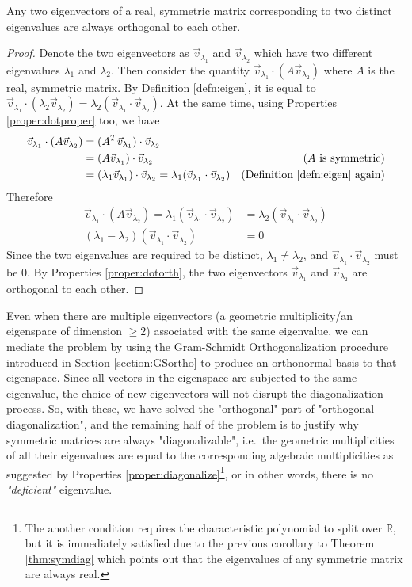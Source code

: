 \begin{proper}
\label{proper:symortho}
Any two eigenvectors of a real, symmetric matrix corresponding to two distinct eigenvalues are always orthogonal to each other.
\end{proper}
\begin{proof}
Denote the two eigenvectors as $\vec{v}_{\lambda_1}$ and $\vec{v}_{\lambda_2}$ which have two different eigenvalues $\lambda_1$ and $\lambda_2$. Then consider the quantity $\vec{v}_{\lambda_1} \cdot (A\vec{v}_{\lambda_2})$ where $A$ is the real, symmetric matrix. By Definition \ref{defn:eigen}, it is equal to $\vec{v}_{\lambda_1} \cdot (\lambda_{2}\vec{v}_{\lambda_2}) = \lambda_{2}(\vec{v}_{\lambda_1} \cdot \vec{v}_{\lambda_2})$. At the same time, using Properties \ref{proper:dotproper} too, we have
\begin{align*}
\vec{v}_{\lambda_1}\cdot (A\vec{v}_{\lambda_2}) &=    (A^T\vec{v}_{\lambda_1})\cdot \vec{v}_{\lambda_2} \\
&= (A\vec{v}_{\lambda_1})\cdot \vec{v}_{\lambda_2} &\text{($A$ is symmetric)} \\
&= (\lambda_1\vec{v}_{\lambda_1})\cdot \vec{v}_{\lambda_2} = \lambda_1(\vec{v}_{\lambda_1}\cdot \vec{v}_{\lambda_2}) &\text{(Definition \ref{defn:eigen} again)}
\end{align*}
Therefore
\begin{align*}
\vec{v}_{\lambda_1}\cdot (A\vec{v}_{\lambda_2}) =  \lambda_1(\vec{v}_{\lambda_1}\cdot \vec{v}_{\lambda_2}) &= \lambda_{2}(\vec{v}_{\lambda_1}\cdot \vec{v}_{\lambda_2}) \\
(\lambda_{1}-\lambda_{2})(\vec{v}_{\lambda_1}\cdot \vec{v}_{\lambda_2}) &= 0
\end{align*}
Since the two eigenvalues are required to be distinct, $\lambda_{1} \neq \lambda_{2}$, and $\vec{v}_{\lambda_1}\cdot \vec{v}_{\lambda_2}$ must be $0$. By Properties \ref{proper:dotorth}, the two eigenvectors $\vec{v}_{\lambda_1}$ and $\vec{v}_{\lambda_2}$ are orthogonal to each other.
\end{proof}
Even when there are multiple eigenvectors (a geometric multiplicity/an eigenspace of dimension $\geq 2$) associated with the same eigenvalue, we can mediate the problem by using the Gram-Schmidt Orthogonalization procedure introduced in Section \ref{section:GSortho} to produce an orthonormal basis to that eigenspace. Since all vectors in the eigenspace are subjected to the same eigenvalue, the choice of new eigenvectors will not disrupt the diagonalization process. So, with these, we have solved the "orthogonal" part of "orthogonal diagonalization", and the remaining half of the problem is to justify why symmetric matrices are always "diagonalizable", i.e.\ the geometric multiplicities of all their eigenvalues are equal to the corresponding algebraic multiplicities as suggested by Properties \ref{proper:diagonalize}\footnote{The another condition requires the characteristic polynomial to split over $\mathbb{R}$, but it is immediately satisfied due to the previous corollary to Theorem \ref{thm:symdiag} which points out that the eigenvalues of any symmetric matrix are always real.}, or in other words, there is no \textit{"deficient"} eigenvalue.
